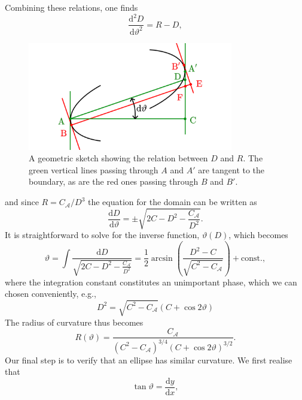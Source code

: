 Combining these relations, one finds
\begin{equation}
    \frac{\mathrm{d}^2 D}{\mathrm{d} \vartheta^2} = R - D,
\end{equation}
\begin{figure}
    \centering
    \includegraphics[width=0.8\textwidth]{3_chapters/1_papers/AE-TE/figures/boundary-proof-ellipse.png}
    \caption{A geometric sketch showing the relation between $D$ and $R$. The green vertical lines passing through $A$ and $A'$ are tangent to the boundary, as are the red ones passing through $B$ and $B'$.}
    \label{fig:proof-of-domain-sketch}
\end{figure}
and since $R = C_\mathcal{A}/D^3$ the equation for the domain can be written as
\begin{equation}
    \frac{\mathrm{d} D}{\mathrm{d} \vartheta} = \pm \sqrt{2C - D^2 - \frac{C_\mathcal{A}}{D^2}}.
\end{equation}
It is straightforward to solve for the inverse function, $\vartheta(D)$, which becomes
\begin{equation}
    \vartheta = \int \frac{\mathrm{d}D}{\sqrt{2C-D^2-\frac{C_\mathcal{A}}{D^2}}}
     = \frac{1}{2}\arcsin \left( \frac{D^2 - C}{\sqrt{C^2 - C_\mathcal{A}}} \right) + \mathrm{const.},
\end{equation}
where the integration constant constitutes an unimportant phase, which we can chosen conveniently, e.g., 
\begin{equation}
    D^2 = \sqrt{C^2-C_\mathcal{A}} (C  +\cos 2\vartheta)
\end{equation}
The radius of curvature thus becomes
\begin{equation}
    R(\vartheta) = \frac{C_\mathcal{A}}{(C^2-C_\mathcal{A})^{3/4}(C + \cos 2 \vartheta)^{3/2}}.
    \label{eq:radius-of-curv}
\end{equation}
Our final step is to verify that an ellipse has similar curvature. We first realise that
\begin{equation}
    \tan \vartheta = \frac{\mathrm{d} y}{\mathrm{d}x},
\end{equation}
